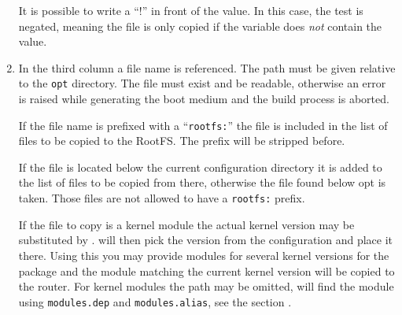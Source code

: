 \begin{enumerate}
        It is possible to write a ``!'' in front of the value. In this case,
        the test is negated, meaning the file is only copied if the variable
        does \emph{not} contain the value.

      \item  In the third column a file name is referenced. The path must be given
	relative to the \texttt{opt} directory. The file must exist and be readable,
	otherwise an error is raised while generating the boot medium and the build process
	is aborted.

        If the file name is prefixed with a ``\texttt{rootfs:}'' the file is included in the
        list of files to be copied to the RootFS. The prefix will be stripped before.

        If the file is located below the current configuration directory it is added
        to the list of files to be copied from there, otherwise the file found below
        opt is taken. Those files are not allowed to have a \texttt{rootfs:} prefix.

        If the file to copy is a kernel module the actual kernel version may be substituted
        by .  will then pick the version from the configuration
        and place it there. Using this you may provide modules for several kernel versions
        for the package and the module matching the current kernel version will be copied to
        the router.
        For kernel modules the path may be omitted,  will find the module
        using \texttt{modules.dep} and \texttt{modules.alias}, see the section
        .


\end{enumerate}

